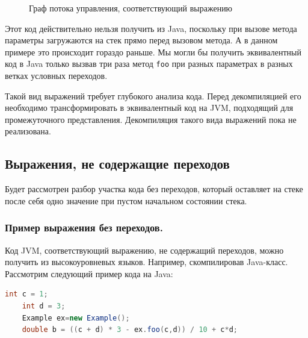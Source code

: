 \begin{figure} [h]
\caption{Граф потока управления, соответствующий выражению}\label{graph}
\end{figure}

Этот код действительно нельзя получить из Java, поскольку при вызове метода параметры загружаются на стек прямо перед вызовом метода. 
А в данном примере это происходит гораздо раньше. Мы могли бы получить эквивалентный код в Java только вызвав три раза метод \texttt{foo} при разных 
параметрах в разных ветках условных переходов. 

Такой вид выражений требует глубокого анализа кода. Перед декомпиляцией его необходимо трансформировать в эквивалентный код на JVM, подходящий для промежуточного 
представления. Декомпиляция такого вида выражений пока не реализована. 

\subsection{Выражения, не содержащие переходов}
Будет рассмотрен разбор участка кода без переходов, который оставляет на стеке после себя одно значение при пустом начальном состоянии стека. 

\subsubsection{Пример выражения без переходов.}

Код JVM, соответствующий выражению, не содержащий переходов, можно получить из высокоуровневых языков. Например, скомпилировав Java-класс. 
Рассмотрим следующий пример кода на Java: 

\begin{lstlisting}[language = JAVA]
	int c = 1; 
 	int d = 3; 
	Example ex=new Example();
 	double b = ((c + d) * 3 - ex.foo(c,d)) / 10 + c*d; 
\end{lstlisting}

